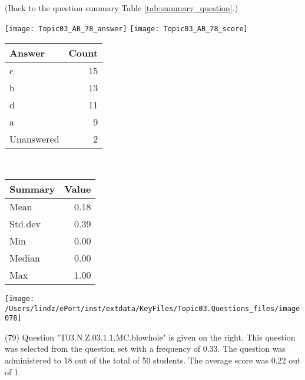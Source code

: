 \documentclass[12pt,english,nohyper]{tufte-handout}\usepackage[]{graphicx}\usepackage[]{color}
\begin{document}
 (Back to the question summary Table \ref{tab:summary_question}.)

\begin{center} \texttt{[image: Topic03\_AB\_78\_answer]} \texttt{[image: Topic03\_AB\_78\_score]} \end{center} 

\begin{center}%
\begin{tabular}{lr}
  \hline
Answer & Count \\ 
  \hline
c &  15 \\ 
  b &  13 \\ 
  d &  11 \\ 
  a &   9 \\ 
  Unanswered &   2 \\ 
   \hline
\end{tabular}
~~~~~~~~%
\begin{tabular}{lr}
  \hline
Summary & Value \\ 
  \hline
Mean & 0.18 \\ 
  Std.dev & 0.39 \\ 
  Min & 0.00 \\ 
  Median & 0.00 \\ 
  Max & 1.00 \\ 
   \hline
\end{tabular}
\end{center}\newpage{}



\vspace{5cm}\begin{marginfigure}\texttt{[image: /Users/lindz/ePort/inst/extdata/KeyFiles/Topic03.Questions\_files/image078]}\end{marginfigure}\vspace{-5cm} (79) Question "T03.N.Z.03.1.1.MC.blowhole" is given on the right. This question was selected from the question set with a frequency of 0.33. The question was administered to 18 out of the total of 50 students. The average score was 0.22 out of 1.
\end{document}
